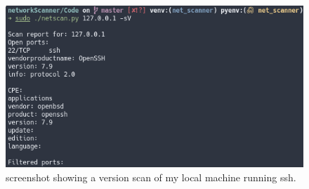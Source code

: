 \documentclass[titlepage]{article}
\begin{document}
\begin{figure}[H]
  \centering
  \includegraphics[width=\textwidth]{sshversiondetect.png}
  \caption{%
    screenshot showing a version scan of my local machine running ssh.
  }\label{versiondetecttest}
\end{figure}
\end{document}
